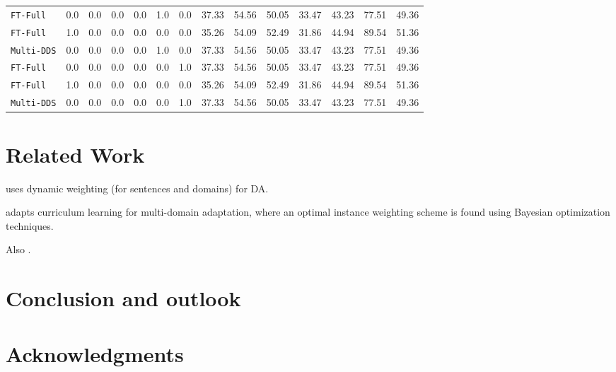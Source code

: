 \documentclass[11pt,a4paper]{article}
\newcommand{\system}[1]{\texttt{{#1}}}
\begin{document}
\begin{table}
\begin{adjustbox}{width=2\columnwidth,center}
\begin{tabular}{|p{2cm}|*{13}{r|}}
  \system{FT-Full} & 0.0 &0.0 & 0.0 &0.0 &1.0 & 0.0 &37.33& 54.56& 50.05& 33.47& 43.23& 77.51& 49.36\\
  \system{FT-Full} & 1.0 &0.0 & 0.0 &0.0 &0.0 & 0.0 &35.26 &54.09 &52.49& 31.86& 44.94& 89.54& 51.36\\
  \system{Multi-DDS} & 0.0 &0.0 & 0.0 &0.0 &1.0 & 0.0 &37.33& 54.56& 50.05& 33.47& 43.23& 77.51& 49.36\\
  \system{FT-Full} & 0.0 &0.0 & 0.0 &0.0 &0.0 & 1.0 &37.33& 54.56& 50.05& 33.47& 43.23& 77.51& 49.36\\
  \system{FT-Full} & 1.0 &0.0 & 0.0 &0.0 &0.0 & 0.0 &35.26 &54.09 &52.49& 31.86& 44.94& 89.54& 51.36\\
  \system{Multi-DDS} & 0.0 &0.0 & 0.0 &0.0 &0.0 & 1.0 &37.33& 54.56& 50.05& 33.47& 43.23& 77.51& 49.36\\
  \hline
  \end{tabular}
  \end{adjustbox}
  \label{tab:redomains}
\end{table}
\section{Related Work \label{sec:related}}
\cite{Wang17instance} uses dynamic weighting (for sentences and domains) for DA.

\cite{Wang20multidomain} adapts curriculum learning \cite{BengioXX} for multi-domain adaptation, where an optimal instance weighting scheme is found using Bayesian optimization techniques.

Also \cite{Saunders19adaptive}.

\section{Conclusion and outlook \label{sec:discussion}}
\section*{Acknowledgments}


\end{document}
